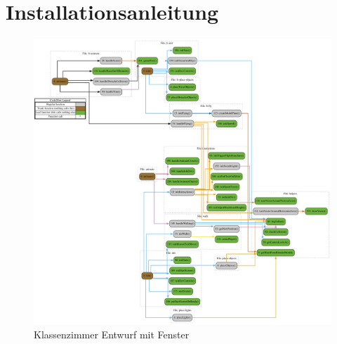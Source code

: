 \section{Installationsanleitung}

\begin{figure}[H]
  \centering
  \includegraphics[width=1\textwidth]{images/function-call-graph.pdf}
  \caption{Klassenzimmer Entwurf mit Fenster}
  \label{fig:Entwurf}
\end{figure}\noindent
